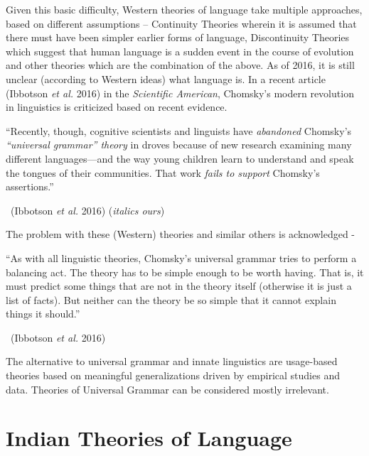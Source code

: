 Given this basic difficulty, Western theories of language take multiple approaches, based on different assumptions – Continuity Theories wherein it is assumed that there must have been simpler earlier forms of language, Discontinuity Theories which suggest that human language is a sudden event in the course of evolution and other theories which are the combination of the above. As of 2016, it is still unclear (according to Western ideas) what language is. In a recent article (Ibbotson \textit{et al.} 2016) in the \textit{Scientific American}, Chomsky’s modern revolution in linguistics is criticized based on recent evidence.

\begin{myquote}
“Recently, though, cognitive scientists and linguists have \textit{abandoned} Chomsky’s \textit{“universal grammar” theory} in droves because of new research examining many different languages—and the way young children learn to understand and speak the tongues of their communities. That work \textit{fails to support} Chomsky’s assertions.”

~\hfill (Ibbotson \textit{et al.} 2016) (\textit{italics ours})
\end{myquote}

\newpage

The problem with these (Western) theories and similar others is acknowledged -

\begin{myquote}
“As with all linguistic theories, Chomsky’s universal grammar tries to perform a balancing act. The theory has to be simple enough to be worth having. That is, it must predict some things that are not in the theory itself (otherwise it is just a list of facts). But neither can the theory be so simple that it cannot explain things it should.”

~\hfill (Ibbotson \textit{et al.} 2016)
\end{myquote}

The alternative to universal grammar and innate linguistics are usage-based theories based on meaningful generalizations driven by empirical studies and data. Theories of Universal Grammar can be considered mostly irrelevant. 

\section*{Indian Theories of Language}

